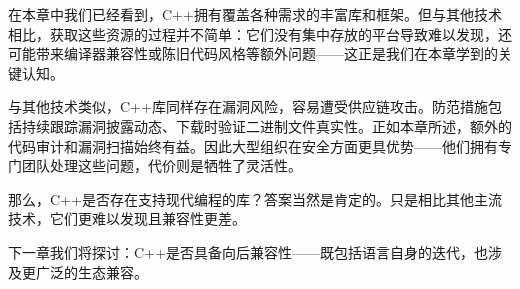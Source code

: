 在本章中我们已经看到，C++拥有覆盖各种需求的丰富库和框架。但与其他技术相比，获取这些资源的过程并不简单：它们没有集中存放的平台导致难以发现，还可能带来编译器兼容性或陈旧代码风格等额外问题——这正是我们在本章学到的关键认知。

与其他技术类似，C++库同样存在漏洞风险，容易遭受供应链攻击。防范措施包括持续跟踪漏洞披露动态、下载时验证二进制文件真实性。正如本章所述，额外的代码审计和漏洞扫描始终有益。因此大型组织在安全方面更具优势——他们拥有专门团队处理这些问题，代价则是牺牲了灵活性。

那么，C++是否存在支持现代编程的库？答案当然是肯定的。只是相比其他主流技术，它们更难以发现且兼容性更差。

下一章我们将探讨：C++是否具备向后兼容性——既包括语言自身的迭代，也涉及更广泛的生态兼容。